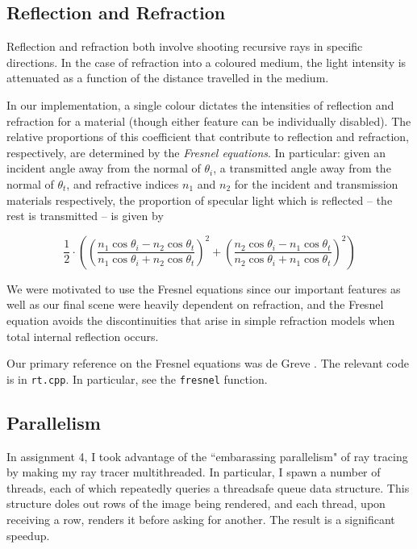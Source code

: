 \documentclass{article}
\begin{document}
\subsection{Reflection and Refraction}

Reflection and refraction both involve shooting recursive rays in
specific directions. In the case of refraction into a coloured medium, the
light intensity is attenuated as a function of the distance travelled in the
medium.

In our implementation, a single colour dictates the intensities of reflection and
refraction for a material (though either feature can be individually disabled).
The relative proportions of this coefficient that contribute to reflection and
refraction, respectively, are determined by the \emph{Fresnel equations}. In
particular: given an incident angle away from the normal of $\theta_i$,
a transmitted angle away from the normal of $\theta_t$, and refractive indices
$n_1$ and $n_2$ for the incident and transmission materials respectively, the
proportion of specular light which is reflected -- the rest is transmitted -- is
given by

$$\frac{1}{2} \cdot \left(\left(\frac{n_1 \cos\theta_i - n_2 \cos\theta_t}{n_1
\cos\theta_i + n_2\cos\theta_t}\right)^2 + \left(\frac{n_2 \cos\theta_i -
n_1\cos\theta_t}{n_2\cos\theta_i + n_1\cos\theta_t}\right)^2\right)$$

We were motivated to use the Fresnel equations since our important features as
well as our final scene were heavily dependent on refraction, and the Fresnel
equation avoids the discontinuities that arise in simple refraction models
when total internal reflection occurs.

Our primary reference on the Fresnel equations was de Greve \cite{degreve}. The
relevant code is in {\tt rt.cpp}. In particular, see the {\tt fresnel} function.

\subsection{Parallelism}

In assignment 4, I took advantage of the ``embarassing parallelism" of ray
tracing by making my ray tracer multithreaded. In particular, I spawn a number
of threads, each of which repeatedly queries a threadsafe queue data structure.
This structure doles out rows of the image being rendered, and each thread, upon
receiving a row, renders it before asking for another. The result is a
significant speedup.
\end{document}
